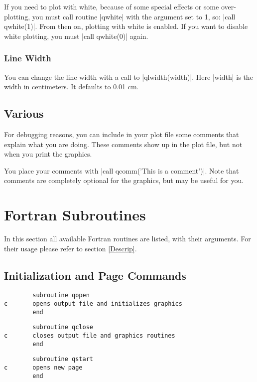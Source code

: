 \documentclass{article}
\begin{document}
If you need to plot with white, because of some special effects or some
over-plotting, you must call routine |qwhite| with the argument set to
1, so: |call qwhite(1)|. From then on, plotting with white is enabled.
If you want to disable white plotting, you must |call qwhite(0)|
again.


\subsubsection{Line Width}

You can change the line width with a call to |qlwidth(width)|.  Here
|width| is the width in centimeters. It defaults to 0.01 cm.


\subsection{Various}

For debugging reasons, you can include in your plot file some comments
that explain what you are doing. These comments show up in the plot
file, but not when you print the graphics.

You place your comments with |call qcomm('This is a comment')|. Note
that comments are completely optional for the graphics, but may be
useful for you.


\section{Fortran Subroutines}

\label{ForSeq}


In this section all available Fortran routines are listed, with their 
arguments. For their usage please refer to section \ref{Descrip}.


\subsection{Initialization and Page Commands}


\begin{verbatim}
        subroutine qopen
c       opens output file and initializes graphics
        end
\end{verbatim}

\begin{verbatim}
        subroutine qclose
c       closes output file and graphics routines
        end
\end{verbatim}

\begin{verbatim}
        subroutine qstart
c       opens new page
        end
\end{verbatim}
\end{document}
